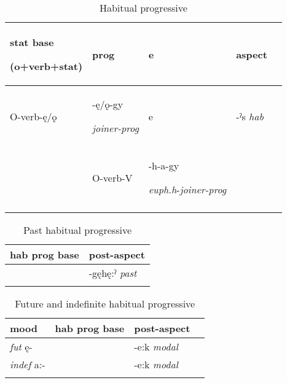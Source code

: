 \lipsum[1-1]


\begin{table}
\caption{Habitual progressive}
\label{tab:1:habprog}
\scriptsize{
\begin{tabularx}{\textwidth}{XXXXX}
\lsptoprule
stat base

(o+verb+stat) & prog & e & aspect\\
\midrule
O-verb-ę/ǫ & {}-ę/ǫ-gy 

\textit{joiner-prog}

& e & {}-ˀs \textit{hab}\\
& O-verb-V & {}-h-a-gy 

\textit{euph.h}{}-\textit{joiner-prog} &  & \\
\lspbottomrule
\end{tabularx}}
\end{table}




\lipsum[1-1]

\begin{table}
\caption{Past habitual progressive}
\label{tab:1:pasthabprog}
\scriptsize{
\begin{tabularx}{.5\textwidth}{XX}
\lsptoprule
hab prog base & post-aspect\\
\midrule
& {}-gęhę:ˀ \textit{past}\\
\lspbottomrule
\end{tabularx}}
\end{table}


\begin{table}
\caption{Future and indefinite habitual progressive}
\label{tab:1:futidfhabprog}
\scriptsize{
\begin{tabularx}{.66\textwidth}{XXXX}
\lsptoprule
mood & hab prog base & post-aspect\\
\midrule
\textit{fut} ę- &  & {}-e:k \textit{modal}\\
\textit{indef} a:- &  & {}-e:k \textit{modal}\\
\lspbottomrule
\end{tabularx}}
\end{table}
